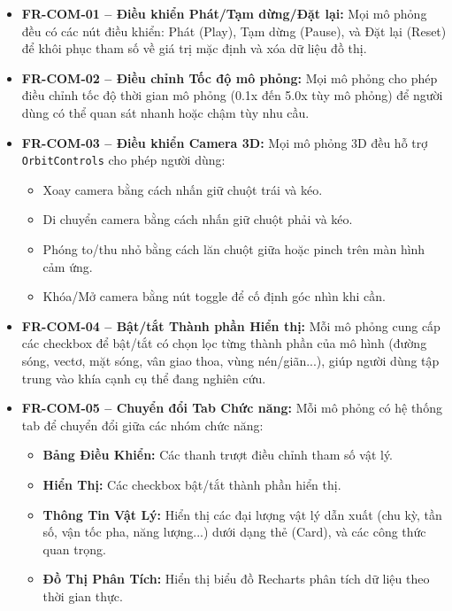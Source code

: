 \begin{itemize}
    \item \textbf{FR-COM-01 – Điều khiển Phát/Tạm dừng/Đặt lại:} Mọi mô phỏng đều có các nút điều khiển: Phát (Play), Tạm dừng (Pause), và Đặt lại (Reset) để khôi phục tham số về giá trị mặc định và xóa dữ liệu đồ thị.
    
    \item \textbf{FR-COM-02 – Điều chỉnh Tốc độ mô phỏng:} Mọi mô phỏng cho phép điều chỉnh tốc độ thời gian mô phỏng (0.1x đến 5.0x tùy mô phỏng) để người dùng có thể quan sát nhanh hoặc chậm tùy nhu cầu.
    
    \item \textbf{FR-COM-03 – Điều khiển Camera 3D:} Mọi mô phỏng 3D đều hỗ trợ \texttt{OrbitControls} cho phép người dùng:
    \begin{itemize}
        \item Xoay camera bằng cách nhấn giữ chuột trái và kéo.
        \item Di chuyển camera bằng cách nhấn giữ chuột phải và kéo.
        \item Phóng to/thu nhỏ bằng cách lăn chuột giữa hoặc pinch trên màn hình cảm ứng.
        \item Khóa/Mở camera bằng nút toggle để cố định góc nhìn khi cần.
    \end{itemize}
    
    \item \textbf{FR-COM-04 – Bật/tắt Thành phần Hiển thị:} Mỗi mô phỏng cung cấp các checkbox để bật/tắt có chọn lọc từng thành phần của mô hình (đường sóng, vectơ, mặt sóng, vân giao thoa, vùng nén/giãn...), giúp người dùng tập trung vào khía cạnh cụ thể đang nghiên cứu.
    
    \item \textbf{FR-COM-05 – Chuyển đổi Tab Chức năng:} Mỗi mô phỏng có hệ thống tab để chuyển đổi giữa các nhóm chức năng:
    \begin{itemize}
        \item \textbf{Bảng Điều Khiển:} Các thanh trượt điều chỉnh tham số vật lý.
        \item \textbf{Hiển Thị:} Các checkbox bật/tắt thành phần hiển thị.
        \item \textbf{Thông Tin Vật Lý:} Hiển thị các đại lượng vật lý dẫn xuất (chu kỳ, tần số, vận tốc pha, năng lượng...) dưới dạng thẻ (Card), và các công thức quan trọng.
        \item \textbf{Đồ Thị Phân Tích:} Hiển thị biểu đồ Recharts phân tích dữ liệu theo thời gian thực.
    \end{itemize}
    

\end{itemize}
